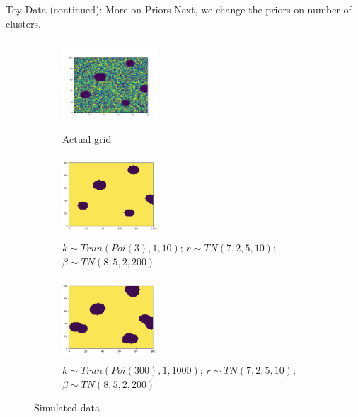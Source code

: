 \documentclass[10pt,mathserif]{beamer}
\begin{document}
\begin{frame}{Toy Data (continued): More on Priors}
Next, we change the priors on number of clusters.
\begin{figure}[t!]
    \centering
    \begin{subfigure}[t]{0.3\textwidth}
        \centering
        \includegraphics[height=1.3in, width=1.4in]{../BDC_gridactual}
        \caption{Actual grid}
    \end{subfigure}%
    \begin{subfigure}[t]{0.3\textwidth}
        \centering
        \includegraphics[height=1.2in, width=1.4in]{../BDC_grid7_c3}
        \caption{ $k \sim Trun(Poi(3), 1, 10)$; $r \sim TN(7, 2, 5, 10)$; $\beta \sim TN(8, 5, 2, 200)$}
    \end{subfigure}%
        \begin{subfigure}[t]{0.3\textwidth}
        \centering
        \includegraphics[height=1.2in, width=1.4in]{../BDC_grid8_c300}
        \caption{ $k \sim Trun(Poi(300), 1, 1000)$; $r \sim TN(7, 2, 5, 10)$; $\beta \sim TN(8, 5, 2, 200)$}
    \end{subfigure}
    \caption{Simulated data}
\end{figure}
\end{frame}
\end{document}
